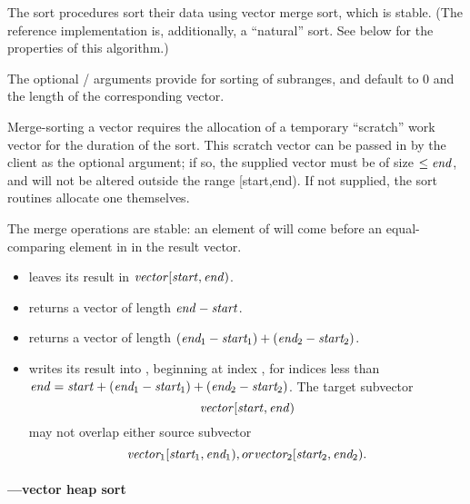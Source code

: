 \begin{protos}
\end{protos}
%
The sort procedures sort their data using vector merge sort, which is
stable. (The reference implementation is, additionally, a ``natural'' sort.
See below for the properties of this algorithm.)

The optional / arguments provide for sorting of subranges, and
default to 0 and the length of the corresponding vector.
    
Merge-sorting a vector requires the allocation of a temporary
``scratch'' work vector for the duration of the sort. This scratch
vector can be passed in by the client as the optional 
argument; if so, the supplied vector must be of size $\leq \var{end}$,
and will not be altered outside the range [start,end). If not
supplied, the sort routines allocate one themselves.

The merge operations are stable: an element of  will
come before an equal-comparing element in  in the
result vector.

\begin{itemize}
\item 
{} leaves its result in
\(\var{vector}[\var{start},\var{end})\).
\item   
{} returns a vector of length
\(\var{end}-\var{start}\).
\item 
{} returns a vector of length
\((\var{end$_1$}-\var{start$_1$})+(\var{end$_2$}-\var{start$_2$})\).
\item 
{} writes its result into , beginning
at index ,
for indices less than \(\var{end} =\var{start} +
(\var{end$_1$}-\var{start$_1$}) + (\var{end$_2$}-\var{start$_2$})\).
The target subvector
\[\var{vector}[\var{start},\var{end})\]
may not overlap either source subvector
\[\var{vector$_1$}[\var{start$_1$},\var{end$_1$}), \textrm{ or }
\var{vector$_2$}[\var{start$_2$},\var{end$_2$}).\]
\end{itemize}

\paragraph{---vector heap sort}

